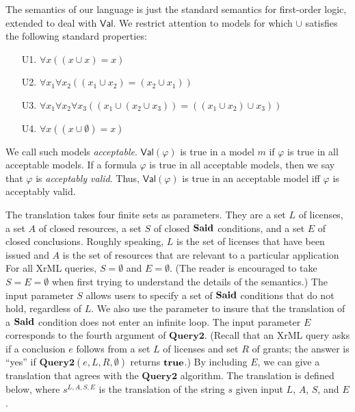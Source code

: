 \documentclass{acmtrans2m}
\newcommand{\<}{
}
\renewcommand{\>}{\rangle}
\newcommand{\union}{\cup}
\renewcommand{\phi}{\varphi}
\newcommand{\Said}{\mathit{\bf Said}}
\newcommand{\true}{\mathit{\bf{true}}}
\newcommand{\scd}{S}
\newcommand{\cc}{e}
\newcommand{\scc}{E}
\newcommand{\XProcTwo}{\textbf{Query2}}
\newcommand{\Val}{\mathsf{Val}}
\newcommand{\tranwithE}[1]{#1^{L, A, \scd, \scc}}
\begin{document}
The semantics of our language is just the standard semantics for first-order logic, extended
to deal with $\Val$.  We restrict attention to models for which $\union$ satisfies the
following standard properties:
\begin{itemize}
\item[U1.] $\forall x((x\union x) = x)$
\item[U2.] $\forall x_1 \forall x_2 ((x_1 \union x_2) = (x_2 \union x_1))$
\item[U3.] $\forall x_1 \forall x_2 \forall x_3 ((x_1 \union (x_2 \union x_3)) = ((x_1 \union x_2) \union x_3))$
\item[U4.] $\forall x((x\union \emptyset) = x)$
\end{itemize}
We call such models \emph{acceptable}.  $\Val(\phi)$ is true in a model $m$ if $\phi$ is true
in all acceptable models.  If a formula $\phi$ is true in all acceptable models, then we say
that $\phi$ is \emph{acceptably valid}.  Thus, $\Val(\phi)$ is true in an acceptable model iff
$\phi$ is acceptably valid.

The translation takes four finite sets as parameters.  They are a set $L$ of licenses, a set
$A$ of closed resources, a set $\scd$ of closed $\Said$ conditions, and a set $\scc$ of closed
conclusions.
Roughly speaking, $L$ is the set of licenses that have been issued
and $A$
is the set of resources that are relevant to a particular application
For all XrML queries, $\scd = \emptyset$ and $\scc = \emptyset$.
(The reader is encouraged to take $\scd = \scc = \emptyset$ when first
trying to understand the details of the semantics.)
The input parameter $\scd$
allows users to specify a set of $\Said$ conditions that do not hold, regardless of $L$.  We
also use the parameter to insure that the translation of a $\Said$ condition does not enter an
infinite loop.  The input parameter $\scc$ corresponds to the fourth argument of $\XProcTwo$.
(Recall that an XrML query asks if a conclusion $\cc$ follows from a set $L$ of licenses and
set $R$ of grants; the answer is ``yes'' if $\XProcTwo(\cc, L, R, \emptyset)$ returns $\true$.)
By including $E$, we can give a translation that
agrees with
the $\XProcTwo$ algorithm.
The translation is defined below, where $\tranwithE{s}$ is the translation of the string $s$ given
input $L$, $A$, $\scd$, and $\scc$.
\end{document}
